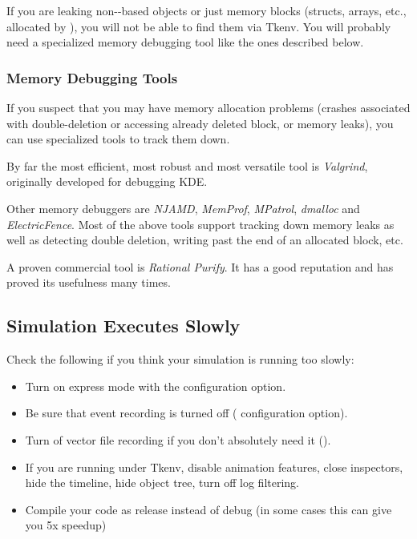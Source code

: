 If you are leaking non--based objects or just
memory blocks (structs, arrays, etc., allocated by ),
you will not be able to find them via Tkenv. You will probably need
a specialized memory debugging tool like the ones described below.

\subsubsection{Memory Debugging Tools}
\label{sec:run-sim:memory-debugging-tools}

If you suspect that you may have memory allocation problems
(crashes associated with double-deletion or accessing already
deleted block, or memory leaks), you can use specialized tools
to track them down.

By far the most efficient, most robust and most versatile tool
is \textit{Valgrind}, originally developed for debugging KDE.

Other memory debuggers are \textit{NJAMD}, \textit{MemProf},
\textit{MPatrol}, \textit{dmalloc} and \textit{ElectricFence}.
Most of the above tools support tracking down memory leaks as well as
detecting double deletion, writing past the end of an allocated block, etc.

A proven commercial tool is \textit{Rational Purify}. It has
a good reputation and has proved its usefulness many times.

\subsection{Simulation Executes Slowly}
\label{sec:run-sim:simulation-executes-slowly}

Check the following if you think your simulation is running too slowly:

\begin{itemize}
  \item Turn on express mode with the  configuration option.
  \item Be sure that event recording is turned off ( configuration option).
  \item Turn of vector file recording if you don't absolutely need it ().
  \item If you are running under Tkenv, disable animation features, close inspectors,
        hide the timeline, hide object tree, turn off log filtering.
  \item Compile your code as release instead of debug (in some cases this can give you 5x speedup)
\end{itemize}


